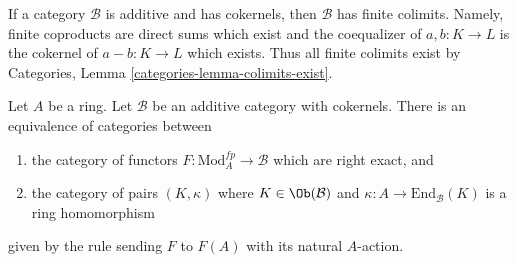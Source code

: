 \noindent
If a category $\mathcal{B}$ is additive and has cokernels,
then $\mathcal{B}$ has finite colimits. Namely, finite coproducts
are direct sums which exist and the coequalizer of $a, b : K \to L$
is the cokernel of $a - b : K \to L$ which exists. Thus all finite
colimits exist by Categories, Lemma \ref{categories-lemma-colimits-exist}.

\begin{lemma}
\label{lemma-functor-on-modules-fp}
Let $A$ be a ring. Let $\mathcal{B}$ be an additive category
with cokernels. There is an equivalence of categories between
\begin{enumerate}
\item the category of functors $F : \text{Mod}^{fp}_A \to \mathcal{B}$
which are right exact, and
\item the category of pairs $(K, \kappa)$ where $K \in \Ob(\mathcal{B})$
and $\kappa : A \to \text{End}_\mathcal{B}(K)$ is a ring homomorphism
\end{enumerate}
given by the rule sending $F$ to $F(A)$ with its natural $A$-action.
\end{lemma}

